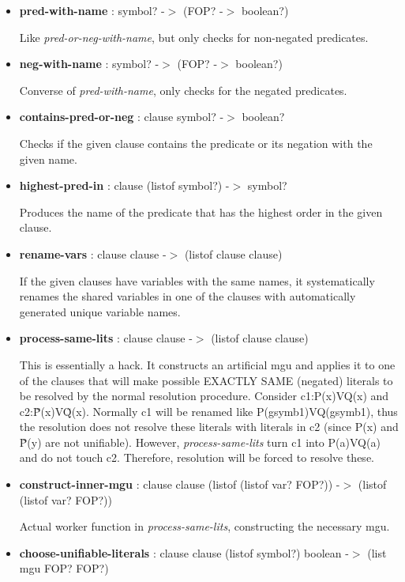 \documentclass[11pt]{report}
\begin{document}
\begin{appendices}
\begin{itemize}
 \item \textbf{pred-with-name} : symbol? -$>$ (FOP? -$>$ boolean?)

Like \textit{pred-or-neg-with-name}, but only checks for non-negated predicates.

 \item \textbf{neg-with-name} : symbol? -$>$ (FOP? -$>$ boolean?)

Converse of \textit{pred-with-name}, only checks for the negated predicates.

 \item \textbf{contains-pred-or-neg} : clause symbol? -$>$ boolean?

Checks if the given clause contains the predicate or its negation with the given name.

 \item \textbf{highest-pred-in} : clause (listof symbol?) -$>$ symbol?

Produces the name of the predicate that has the highest order in the given clause.

 \item \textbf{rename-vars} : clause clause -$>$ (listof clause clause)

If the given clauses have variables with the same names, it systematically renames the shared variables in one of the clauses with automatically generated unique variable names.

 \item \textbf{process-same-lits} : clause clause -$>$ (listof clause clause)

This is essentially a hack. It constructs an artificial mgu and applies it to one of the clauses that will make possible EXACTLY SAME (negated) literals to be resolved by the normal resolution procedure. Consider c1:P(x)VQ(x) and c2:\~P(x)V\~Q(x). Normally c1 will be renamed like P(gsymb1)VQ(gsymb1), thus the resolution does not resolve these literals with literals in c2 (since P(x) and \~P(y) are not unifiable). However, \textit{process-same-lits} turn c1 into P(a)VQ(a) and do not touch c2. Therefore, resolution will be forced to resolve these.

 \item \textbf{construct-inner-mgu} : clause clause (listof (listof var? FOP?)) -$>$ (listof (listof var? FOP?))

Actual worker function in \textit{process-same-lits}, constructing the necessary mgu.

 \item \textbf{choose-unifiable-literals} : clause clause (listof symbol?) boolean -$>$ (list mgu FOP? FOP?)


\end{itemize}
\end{appendices}
\end{document}
